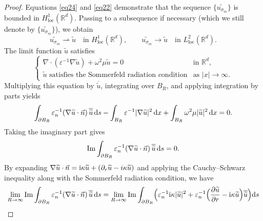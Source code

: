 \documentclass[12pt,reqno]{amsart}
\numberwithin{equation}{section}
\begin{document}
\begin{proof}
Equations \eqref{eq24} and \eqref{eq22} demonstrate that the sequence $\{\widetilde{u_{\sigma_m}}\}$ is bounded in $H^1_{\mathrm{loc}}(\mathbb{R}^d)$. Passing to a subsequence if necessary (which we still denote by $\{\widetilde{u_{\sigma_m}}\}$), we obtain
\begin{equation*}
\widetilde{u_{\sigma_m}} \rightharpoonup \widetilde{u} \quad \text{in } H^1_{\mathrm{loc}}(\mathbb{R}^d), \qquad
\widetilde{u_{\sigma_m}} \to \widetilde{u} \quad \text{in } L^2_{\mathrm{loc}}(\mathbb{R}^d).
\end{equation*}
The limit function $\widetilde{u}$ satisfies
\begin{equation*}
    \begin{cases}
        \nabla \cdot (\varepsilon^{-1} \nabla \widetilde{u}) + \omega^2 \mu \widetilde{u} = 0 & \text{in } \mathbb{R}^d, \\
        \widetilde{u} \text{ satisfies the Sommerfeld radiation condition} & \text{as } |x| \to \infty.
    \end{cases}
\end{equation*}
Multiplying this equation by $\overline{\widetilde{u}}$, integrating over $B_R$, and applying integration by parts yields
\begin{equation}\label{eq25}
    \int_{\partial B_R} \varepsilon_n^{-1} (\nabla\widetilde{u}\cdot\vec{n}) \, \overline{\widetilde{u}} \, {\rm d}s
    - \int_{B_R} \varepsilon^{-1} |\nabla \widetilde{u}|^2 \, {\rm d}x
    + \int_{B_R} \omega^2 \mu |\widetilde{u}|^2 \, {\rm d}x = 0.
\end{equation}
Taking the imaginary part gives
\begin{equation*}
    \operatorname{Im} \int_{\partial B_R} \varepsilon_n^{-1} (\nabla\widetilde{u}\cdot\vec{n}) \, \overline{\widetilde{u}} \, {\rm d}s = 0.
\end{equation*}
By expanding $\nabla\widetilde{u}\cdot\vec{n} = {\rm i}\kappa \widetilde{u} + (\partial_r \widetilde{u} - i\kappa \widetilde{u})$ and applying the Cauchy--Schwarz inequality along with the Sommerfeld radiation condition, we have
\begin{equation}\label{eq49}
\begin{aligned}
\lim_{R\to\infty}\operatorname{Im}\int_{\partial B_R}\varepsilon_n^{-1}(\nabla\widetilde{u}\cdot\vec{n})\,\overline{\widetilde{u}}\,{\rm d}s
&=\lim_{R\to\infty}\operatorname{Im}\int_{\partial B_R}\Bigl(\varepsilon_n^{-1}{\rm i}\kappa|\widetilde{u}|^2
+\varepsilon_n^{-1}\Bigl(\frac{\partial\widetilde{u}}{\partial r}-{\rm i}\kappa\widetilde{u}\Bigr)\overline{\widetilde{u}}\Bigr){\rm d}s \\

\end{aligned}
\end{equation}
\end{proof}
\end{document}
